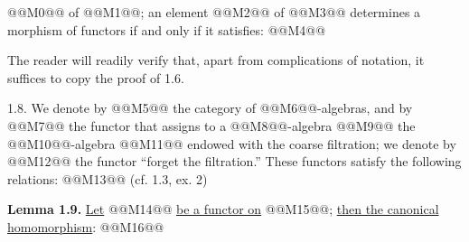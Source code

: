 @@M0@@ of @@M1@@; an element @@M2@@ of @@M3@@ determines a morphism of functors if and only if it satisfies:
@@M4@@

The reader will readily verify that, apart from complications of notation, it suffices to copy the proof of 1.6.

1.8. We denote by @@M5@@ the category of @@M6@@-algebras, and by
@@M7@@
the functor that assigns to a @@M8@@-algebra @@M9@@ the @@M10@@-algebra @@M11@@ endowed with the coarse filtration; we denote by
@@M12@@
the functor ``forget the filtration.'' These functors satisfy the following relations:
@@M13@@
(cf. 1.3, ex. 2)

\textbf{Lemma 1.9.} \uline{Let} @@M14@@ \uline{be a functor on} @@M15@@; \uline{then the canonical homomorphism}:
@@M16@@
